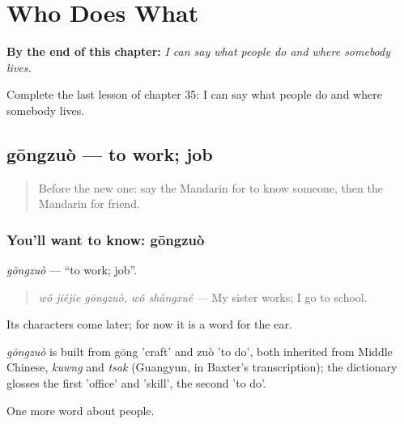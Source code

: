 
\chapter{Who Does What}
\label{ch:zh-who-does-what}

\begin{chapteropening}
\textbf{By the end of this chapter:} \emph{I can say what people do and where somebody lives.}

Complete the last lesson of chapter 35: I can say what people do and where somebody lives.
\end{chapteropening}

\section[gōngzuò]{gōngzuò — to work; job}

\label{lesson:ZH-C35-gongzuo}



\begin{quote}
Before the new one: say the Mandarin for to know someone, then the Mandarin for friend.
\end{quote}

\subsection*{You'll want to know: gōngzuò}
\emph{gōngzuò} — \textquotedblleft{}to work; job\textquotedblright{}.

\begin{quote}
\emph{wǒ jiějie gōngzuò, wǒ shàngxué} — My sister works; I go to school.
\end{quote}

Its characters come later; for now it is a word for the ear.

\begin{cousinweb}
\emph{gōngzuò} is built from gōng 'craft' and zuò 'to do', both inherited from Middle Chinese, \emph{kuwng} and \emph{tsak} (Guangyun, in Baxter's transcription); the dictionary glosses the first 'office' and 'skill', the second 'to do'.
\end{cousinweb}

\begin{grammarlens}[title={What you've built}]
One more word about people.
\end{grammarlens}

